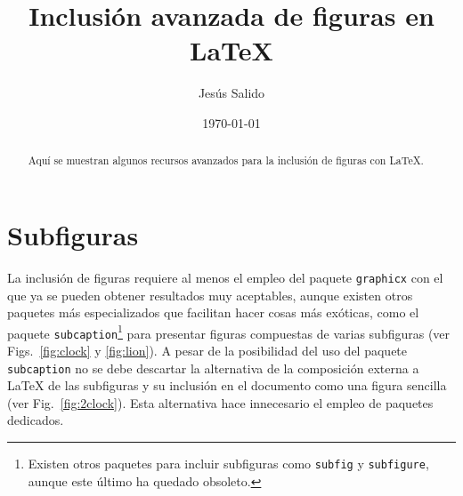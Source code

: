 \documentclass[11pt,a4paper]{article}
\author{Jesús Salido}
\title{Inclusión avanzada de figuras en \LaTeX{}}
\date{\today}
\begin{document}
\maketitle

\begin{abstract}
	Aquí se muestran algunos recursos avanzados para la inclusión de figuras con \LaTeX{}.
\end{abstract}

\tableofcontents
\listoffigures


\section{Subfiguras}
La inclusión de figuras requiere al menos el empleo del paquete \texttt{graphicx} con el que ya se pueden obtener resultados muy aceptables, aunque existen otros paquetes más especializados que facilitan hacer cosas más exóticas, como el paquete \texttt{subcaption}\footnote{Existen otros paquetes para incluir subfiguras como \texttt{subfig} y \texttt{subfigure}, aunque este último ha quedado obsoleto.} para presentar figuras compuestas de varias subfiguras (ver Figs.~\ref{fig:clock} y \ref{fig:lion}). A pesar de la posibilidad del uso del paquete \texttt{subcaption} no se debe descartar la alternativa de la composición externa a \LaTeX{} de las subfiguras y su inclusión en el documento como una figura sencilla (ver Fig.~\ref{fig:2clock}). Esta alternativa hace innecesario el empleo de paquetes dedicados.


\end{document}
